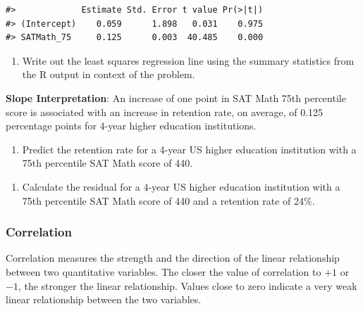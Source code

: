 \documentclass[
]{report}
\providecommand{\tightlist}{%
  \setlength{\itemsep}{0pt}\setlength{\parskip}{0pt}}
\begin{document}
\begin{verbatim}
#>             Estimate Std. Error t value Pr(>|t|)
#> (Intercept)    0.059      1.898   0.031    0.975
#> SATMath_75     0.125      0.003  40.485    0.000
\end{verbatim}

\begin{enumerate}
\def\labelenumi{\arabic{enumi}.}
\setcounter{enumi}{1}
\tightlist
\item
  Write out the least squares regression line using the summary statistics from the R output in context of the problem.
\end{enumerate}

\vspace{0.5in}

\textbf{Slope Interpretation}: An increase of one point in SAT Math 75th percentile score is associated with an increase in retention rate, on average, of 0.125 percentage points for 4-year higher education institutions.

\begin{enumerate}
\def\labelenumi{\arabic{enumi}.}
\setcounter{enumi}{2}
\tightlist
\item
  Predict the retention rate for a 4-year US higher education institution with a 75th percentile SAT Math score of 440.
\end{enumerate}

\vspace{0.4in}

\begin{enumerate}
\def\labelenumi{\arabic{enumi}.}
\setcounter{enumi}{3}
\tightlist
\item
  Calculate the residual for a 4-year US higher education institution with a 75th percentile SAT Math score of 440 and a retention rate of 24\%.
\end{enumerate}

\vspace{0.4in}

\subsubsection*{Correlation}\label{correlation-2}

Correlation measures the strength and the direction of the linear relationship between two quantitative variables. The closer the value of correlation to \(+1\) or \(-1\), the stronger the linear relationship. Values close to zero indicate a very weak linear relationship between the two variables.
\end{document}
